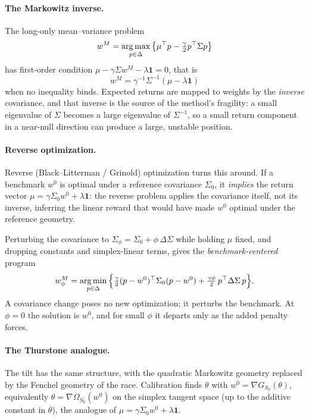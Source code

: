 \paragraph{The Markowitz inverse.}
The long-only mean--variance problem
\[
  w^M = \operatorname*{arg\,max}_{p\in\Delta}\big\{\mu^\top p - \tfrac{\gamma}{2}p^\top\Sigma p\big\}
\]
has first-order condition $\mu - \gamma\Sigma w^M - \lambda\mathbf 1 = 0$, that is
\[
  w^M = \gamma^{-1}\Sigma^{-1}(\mu - \lambda\mathbf 1)
\]
when no inequality binds. Expected returns are mapped to weights by the \emph{inverse}
covariance, and that inverse is the source of the method's fragility: a small
eigenvalue of $\Sigma$ becomes a large eigenvalue of $\Sigma^{-1}$, so a small
return component in a near-null direction can produce a large, unstable position.

\paragraph{Reverse optimization.}
Reverse (Black--Litterman / Grinold) optimization turns this around.
If a benchmark
$w^0$ is optimal under a reference covariance $\Sigma_0$, it \emph{implies} the
return vector $\mu = \gamma\Sigma_0 w^0 + \lambda\mathbf 1$: the reverse problem
applies the covariance itself, not its inverse, inferring the linear reward that
would have made $w^0$ optimal under the reference geometry.

Perturbing the
covariance to $\Sigma_\phi = \Sigma_0 + \phi\,\Delta\Sigma$ while holding $\mu$
fixed, and dropping constants and simplex-linear terms, gives the
\emph{benchmark-centered} program
\[
  w^M_\phi = \operatorname*{arg\,min}_{p\in\Delta}\Big\{\tfrac{\gamma}{2}(p-w^0)^\top\Sigma_0(p-w^0)
  + \tfrac{\gamma\phi}{2}\,p^\top\Delta\Sigma\,p\Big\}.
\]
A covariance change poses no new optimization; it perturbs the benchmark.
At
$\phi=0$ the solution is $w^0$, and for small $\phi$ it departs only as the added
penalty forces.

\paragraph{The Thurstone analogue.}
The tilt has the same structure, with the quadratic Markowitz geometry replaced by
the Fenchel geometry of the race.
Calibration finds $\theta$ with
$w^0 = \nabla G_{S_0}(\theta)$, equivalently $\theta = \nabla\Omega_{S_0}(w^0)$ on
the simplex tangent space (up to the additive constant in $\theta$), the analogue
of $\mu = \gamma\Sigma_0 w^0 + \lambda\mathbf 1$.

